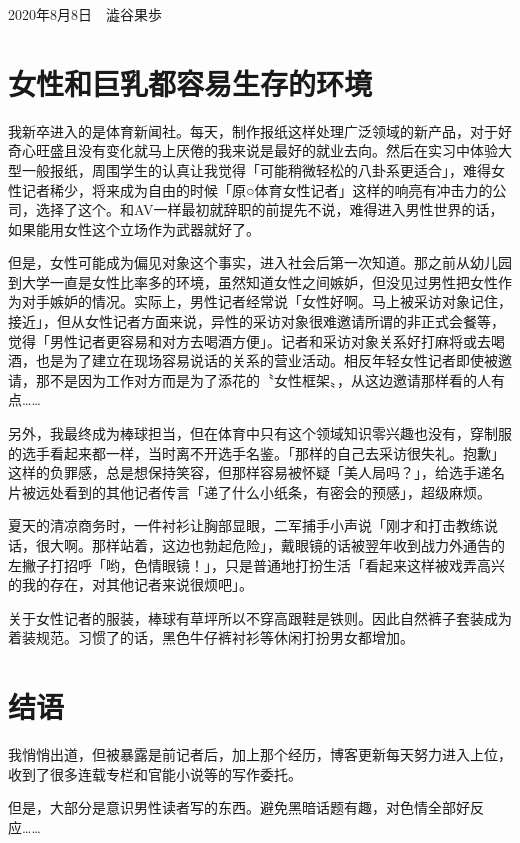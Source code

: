\documentclass[12pt,UTF8]{ctexbook}
\begin{document}
\begin{flushright}
2020年8月8日　澁谷果歩
\end{flushright}

\section{女性和巨乳都容易生存的环境}

我新卒进入的是体育新闻社。每天，制作报纸这样处理广泛领域的新产品，对于好奇心旺盛且没有变化就马上厌倦的我来说是最好的就业去向。然后在实习中体验大型一般报纸，周围学生的认真让我觉得「可能稍微轻松的八卦系更适合」，难得女性记者稀少，将来成为自由的时候「原○体育女性记者」这样的响亮有冲击力的公司，选择了这个。和AV一样最初就辞职的前提先不说，难得进入男性世界的话，如果能用女性这个立场作为武器就好了。

但是，女性可能成为偏见对象这个事实，进入社会后第一次知道。那之前从幼儿园到大学一直是女性比率多的环境，虽然知道女性之间嫉妒，但没见过男性把女性作为对手嫉妒的情况。实际上，男性记者经常说「女性好啊。马上被采访对象记住，接近」，但从女性记者方面来说，异性的采访对象很难邀请所谓的非正式会餐等，觉得「男性记者更容易和对方去喝酒方便」。记者和采访对象关系好打麻将或去喝酒，也是为了建立在现场容易说话的关系的营业活动。相反年轻女性记者即使被邀请，那不是因为工作对方而是为了添花的〝女性框架〟，从这边邀请那样看的人有点……

另外，我最终成为棒球担当，但在体育中只有这个领域知识零兴趣也没有，穿制服的选手看起来都一样，当时离不开选手名鉴。「那样的自己去采访很失礼。抱歉」这样的负罪感，总是想保持笑容，但那样容易被怀疑「美人局吗？」，给选手递名片被远处看到的其他记者传言「递了什么小纸条，有密会的预感」，超级麻烦。

夏天的清凉商务时，一件衬衫让胸部显眼，二军捕手小声说「刚才和打击教练说话，很大啊。那样站着，这边也勃起危险」，戴眼镜的话被翌年收到战力外通告的左撇子打招呼「哟，色情眼镜！」，只是普通地打扮生活「看起来这样被戏弄高兴的我的存在，对其他记者来说很烦吧」。

关于女性记者的服装，棒球有草坪所以不穿高跟鞋是铁则。因此自然裤子套装成为着装规范。习惯了的话，黑色牛仔裤衬衫等休闲打扮男女都增加。

\section{结语}

我悄悄出道，但被暴露是前记者后，加上那个经历，博客更新每天努力进入上位，收到了很多连载专栏和官能小说等的写作委托。

但是，大部分是意识男性读者写的东西。避免黑暗话题有趣，对色情全部好反应……
\end{document}
